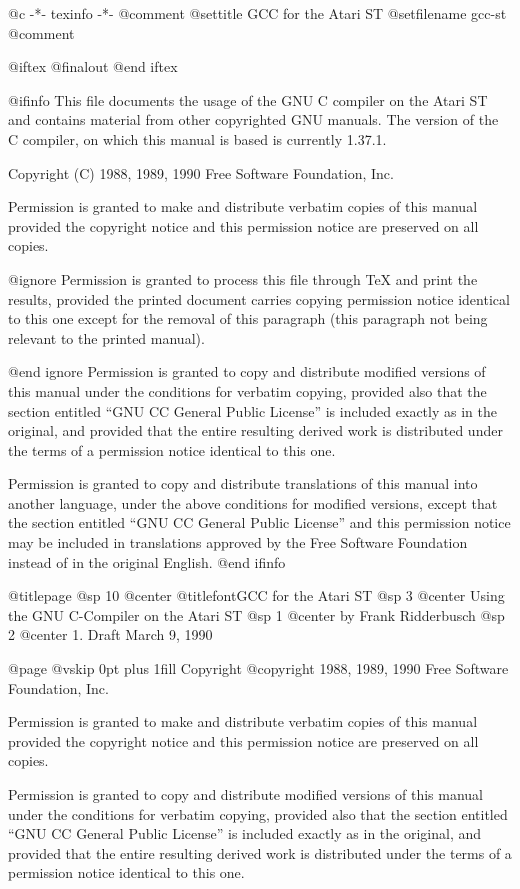   @c -*- texinfo -*-
@comment %
@settitle GCC for the Atari ST
@setfilename gcc-st
@comment %

@iftex
@finalout
@end iftex

@ifinfo
This file documents the usage of the GNU C compiler on the Atari ST
and contains material from other copyrighted GNU manuals. The version of
the C compiler, on which this manual is based is currently 1.37.1.

Copyright (C) 1988, 1989, 1990 Free Software Foundation, Inc.

Permission is granted to make and distribute verbatim copies of
this manual provided the copyright notice and this permission notice
are preserved on all copies.

@ignore
Permission is granted to process this file through TeX and print the
results, provided the printed document carries copying permission
notice identical to this one except for the removal of this paragraph
(this paragraph not being relevant to the printed manual).

@end ignore
Permission is granted to copy and distribute modified versions of this
manual under the conditions for verbatim copying, provided also that the
section entitled ``GNU CC General Public License'' is included exactly as
in the original, and provided that the entire resulting derived work
is distributed under the terms of a permission notice identical to this
one.

Permission is granted to copy and distribute translations of this manual
into another language, under the above conditions for modified versions,
except that the section entitled ``GNU CC General Public License'' and
this permission notice may be included in translations approved by the
Free Software Foundation instead of in the original English.
@end ifinfo

@titlepage
@sp 10
@center @titlefont{GCC for the Atari ST}
@sp 3
@center Using the GNU C-Compiler on the Atari ST
@sp 1
@center by Frank Ridderbusch
@sp 2
@center 1. Draft March 9, 1990

@page
@vskip 0pt plus 1fill
Copyright @copyright{}  1988, 1989, 1990 Free Software Foundation, Inc.

Permission is granted to make and distribute verbatim copies of this
manual provided the copyright notice and this permission notice are
preserved on all copies.

Permission is granted to copy and distribute modified versions of this
manual under the conditions for verbatim copying, provided also that the
section entitled ``GNU CC General Public License'' is included exactly
as in the original, and provided that the entire resulting derived work
is distributed under the terms of a permission notice identical to this
one.

